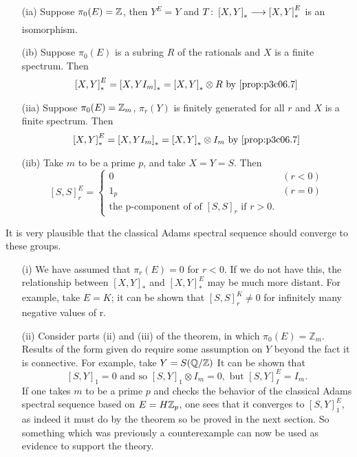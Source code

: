 \documentclass[../main]{subfiles}
\begin{document}
  
\begin{examples}


\begin{enumerate} 
  \item [(ia)] Suppose $\pi_{0}(E)=\mathbb{Z}$, then $Y^E=Y$ and $T\colon \left[X,Y\right]^{}_{\ast} \lar{} \left[X,Y\right]^{E}_{\ast}$ is an isomorphism. 
  \item [(ib)] Suppose $ \pi_{0}(E)$ is a subring $R$ of the rationals and $X$ is a finite spectrum. Then 
    \[
      \left[X,Y\right]^{E}_{\ast} = \left[X,YI_{m}\right]^{}_{\ast} = \left[X,Y\right]^{}_{\ast} \otimes R \text{  by \ref{prop:p3c06.7}}
    \] 
  \item [(iia)] Suppose $ \pi_{0}(E)=\mathbb{Z}_{m}$, $ \pi_{r}(Y)$ is finitely generated for all $r$ and $X$ is a finite spectrum. Then
    \[
      \left[X,Y\right]^{E}_{\ast} = \left[X,YI_{m}\right]^{}_{\ast} = \left[X,Y\right]^{}_{\ast} \otimes I_{m} \text{  by \ref{prop:p3c06.7}}
    \] 
  \item [(iib)] Take $m$ to be a prime $p$, and take $X = Y = S$. Then
    \[
    \left[S,S\right]^{E}_{r} = 
      \begin{cases} 
        0 & (r<0)\\
        1_{p} & (r=0)\\
        \text{the p-component of of $\left[S,S\right]^{}_{r}$ if $r>0$}.  
      \end{cases}
    \] 
\end{enumerate}
\end{examples}
It is very plausible that the classical Adams spectral sequence should converge to these groups.
\begin{warning}
\begin{enumerate} 
  \item [(i)] We have assumed that $\pi_{r}(E)=0$ for $r<0$. If we do not have this, the relationship between $\left[X,Y\right]_{\ast}$ and $\left[X,Y\right]^E _{\ast}$ may be much more distant. For example, take $E=K$; it can be shown that $\left[S,S\right]^K_{r} \neq 0$ for infinitely many negative values of r.

    \item [(ii)] Consider parts (ii) and (iii) of the theorem, in which $\pi_{0}(E)=\mathbb{Z}_{m}$. Results of the form given do require some assumption on $Y$ beyond the fact it is connective. For example, take $Y = S(\mathbb{Q}/\mathbb{Z})$ It can be shown that 
      \[
        \left[S,Y\right]_{1} = 0 \text{  and so } \left[S,Y\right]_{1} \otimes I_{m} = 0, \text{  but } \left[S,Y\right]^E _{I} = I_{m}.
      \] 
  If one takes $m$ to be a prime $p$ and checks the behavior of the classical Adams spectral sequence based on $E=H\mathbb{Z}_{p}$, one sees that it converges to $ \left[S,Y\right]^E _{1}$, as indeed it must do by the theorem so be proved in the next section. So something which was previously a counterexample can now be used as evidence to support the theory.
\end{enumerate}
\end{warning}
\end{document}
